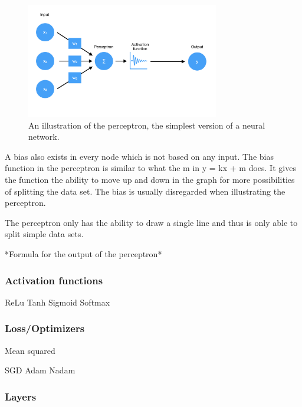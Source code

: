 \begin{figure}[hbtp]
\begin{center}
\includegraphics[width = 0.75\textwidth]{./Images/perceptron.jpg} 
\caption{An illustration of the perceptron, the simplest version of a neural network.}
\end{center}
\end{figure}

A bias also exists in every node which is not based on any input. The bias function in the perceptron is similar to what the m in y = kx + m does. It gives the function the ability to move up and down in the graph for more possibilities of splitting the data set. The bias is usually disregarded when illustrating the perceptron.

The perceptron only has the ability to draw a single line and thus is only able to split simple data sets.

*Formula for the output of the perceptron*

\subsubsection{Activation functions}

ReLu
Tanh
Sigmoid
Softmax

\subsubsection{Loss/Optimizers}

Mean squared

SGD
Adam
Nadam

\subsubsection{Layers}

